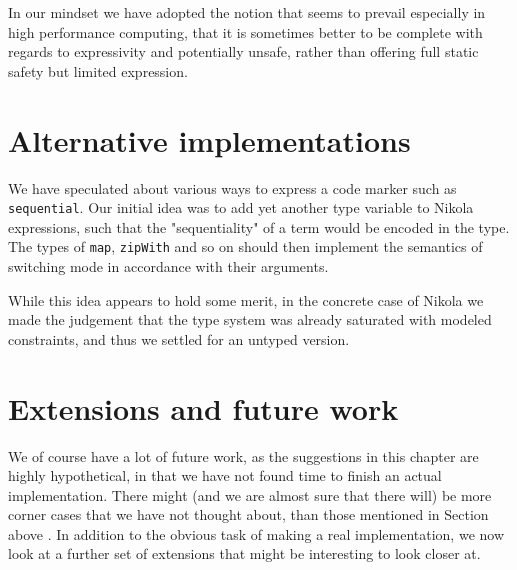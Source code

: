 In our mindset we have adopted the notion that seems to prevail especially in
high performance computing, that it is sometimes better to be complete with
regards to expressivity and potentially unsafe, rather than offering full
static safety but limited expression.


\section{Alternative implementations}

We have speculated about various ways to express a code marker such as
\lstinline{sequential}. Our initial idea was to add yet another type variable
to Nikola expressions, such that the "sequentiality" of a term would be encoded
in the type. The types of \lstinline{map}, \lstinline{zipWith} and so on should
then implement the semantics of switching mode in accordance with their
arguments.

While this idea appears to hold some merit, in the concrete case of Nikola we
made the judgement that the type system was already saturated with modeled
constraints, and thus we settled for an untyped version.

\section{Extensions and future work}
\label{sec:parallelism-future-work}

We of course have a lot of future work, as the suggestions in this
chapter are highly hypothetical, in that we have not found time to
finish an actual implementation. There might (and we are almost sure
that there will) be more corner cases that we have not thought about,
than those mentioned in Section \label{sec:sequential-complications}
above . In addition to the
obvious task of making a real implementation, we now look at a further
set of extensions that might be interesting to look closer at.

